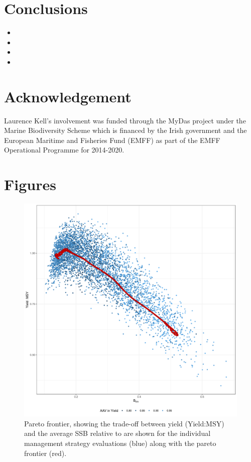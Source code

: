\documentclass[12pt,doublespacing,a4paper]{ouparticle}
\begin{document}
\section{Conclusions}

\begin{itemize}
 \item 
 \item 
 \item 
 \item 
\end{itemize}

\section{Acknowledgement}

Laurence Kell's involvement was funded through the MyDas project under the Marine Biodiversity Scheme which is financed by the Irish government and the European Maritime and Fisheries Fund (EMFF) as part of the EMFF Operational Programme for 2014-2020. 

\clearpage




\clearpage
\section{Figures}

\newpage
\begin{figure}[h]
\centering
\includegraphics[width=\textwidth]{base-figScatter2-1.png}
\caption{Pareto frontier, showing  the trade-off between yield (Yield:MSY) and the average SSB relative to  are shown for the individual management strategy evaluations (blue) along with the pareto frontier (red).}
\label{fig:pareto}
\end{figure}
\end{document}

